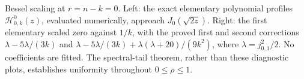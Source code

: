 \caption{Bessel scaling at $r=n-k=0$. Left: the exact elementary polynomial profiles $\mathcal H_{0,k}^{0}(z)$, evaluated numerically, approach $J_0(\sqrt{2z})$. Right: the first elementary scaled zero against $1/k$, with the proved first and second corrections $\lambda-5\lambda/(3k)$ and $\lambda-5\lambda/(3k)+\lambda(\lambda+20)/(9k^2)$, where $\lambda=j_{0,1}^2/2$. No coefficients are fitted. The spectral-tail theorem, rather than these diagnostic plots, establishes uniformity throughout $0\leq\rho\leq1$.}
